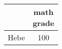 \documentclass[a4paper,12pt]{article}
\begin{document}
	\begin{table}
		\settowidth{}
		\begin{tabular}{|c|c|}
			\hline
			\thead{name} & \rothead{math\\grade} \\  
			\hline
			Hebe  & 100 \\
			\hline
		\end{tabular}
	\end{table}
\end{document}
